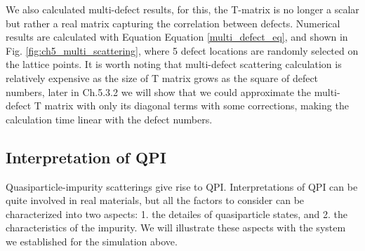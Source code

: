 We also calculated multi-defect results, for this, the T-matrix is no longer a scalar but rather a real matrix capturing the correlation between defects. Numerical results are calculated with Equation Equation \ref{multi_defect_eq}, and shown in Fig. \ref{fig:ch5_multi_scattering}, where 5 defect locations are randomly selected on the lattice points. It is worth noting that multi-defect scattering calculation is relatively expensive as the size of T matrix grows as the square of defect numbers, later in Ch.5.3.2 we will show that we could approximate the multi-defect T matrix with only its diagonal terms with some corrections, making the calculation time linear with the defect numbers.  


\subsection{Interpretation of QPI}\label{subsection: interpretationQPI}
Quasiparticle-impurity scatterings give rise to \ac{QPI}. Interpretations of \ac{QPI} can be quite involved in real materials, but all the factors to consider can be characterized into two aspects: 1. the detailes of quasiparticle states, and 2. the characteristics of the impurity. We will illustrate these aspects with the system we established for the simulation above. 

